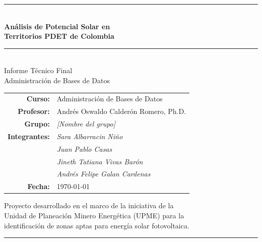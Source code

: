 \documentclass[12pt, a4paper]{report}
\begin{document}
\begin{titlepage}
  \centering
  \vspace*{1cm}


  {\color{upmeBlue}\rule{\textwidth}{2pt}}\\[0.8em]

  {\Huge\bfseries\color{upmeBlue}
    Análisis de Potencial Solar en\\[0.4em]
    Territorios PDET de Colombia}\\[0.8em]

  {\color{upmeBlue}\rule{\textwidth}{0.8pt}}\\[1.5em]

  {\Large Informe Técnico Final}\\[0.4em]
  {\large Administración de Bases de Datos}\\[2em]

  \begin{tabular}{rl}
    \textbf{Curso:}    & Administración de Bases de Datos \\[0.3em]
    \textbf{Profesor:} & Andrés Oswaldo Calderón Romero, Ph.D. \\[0.3em]
    \textbf{Grupo:}    & \textit{[Nombre del grupo]} \\[0.3em]
    \textbf{Integrantes:} & \textit{Sara Albarracin Niño} \\
                          & \textit{Juan Pablo Casas} \\
                          & \textit{Jineth Tatiana Vivas Barón} \\
                          & \textit{Andrés Felipe Galan Cardenas} \\[0.3em]
    \textbf{Fecha:}    & \today \\
  \end{tabular}

  \vfill

  {\small\color{upmeGray}
    Proyecto desarrollado en el marco de la iniciativa de la\\
    Unidad de Planeación Minero Energética (UPME) para la\\
    identificación de zonas aptas para energía solar fotovoltaica.}

  \vspace{1em}
  {\color{upmeBlue}\rule{\textwidth}{1.5pt}}
\end{titlepage}
\end{document}
